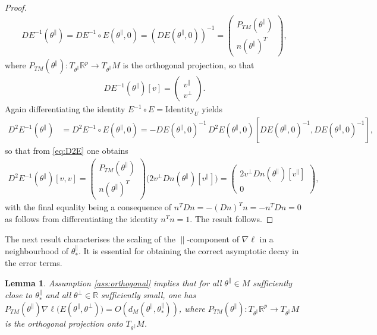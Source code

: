 \documentclass{article}
\newcommand{\RB}{\mathbb{R}}
\newcommand{\tpa}{\theta^{\parallel}}
\newcommand{\tpe}{\theta^{\perp}}
\theoremstyle{plain}
\newtheorem{lemma}[theorem]{Lemma}
\theoremstyle{definition}
\theoremstyle{remark}
\begin{document}
\begin{proof}
    \begin{align}
        DE^{-1}(\tpa) = DE^{-1}\circ E(\tpa,0) = (DE(\tpa,0))^{-1} = \begin{pmatrix} P_{TM}(\tpa) \\ n(\tpa)^T\end{pmatrix},
    \end{align}
    where $P_{TM}(\tpa):T_{\tpa}\RB^p\rightarrow T_{\tpa}M$ is the orthogonal projection, so that
    \begin{align}
        DE^{-1}(\tpa)[v] = \begin{pmatrix} v^{\parallel} \\ v^{\perp}\end{pmatrix}.
    \end{align}
    Again differentiating the identity $E^{-1}\circ E = \text{Identity}_{U}$ yields
    \begin{align}
        D^2E^{-1}(\tpa) &= D^2E^{-1}\circ E(\tpa,0) = -DE(\tpa,0)^{-1}\,D^2E(\tpa,0)[DE(\tpa,0)^{-1},DE(\tpa,0)^{-1}],
    \end{align}
    so that from \eqref{eq:D2E} one obtains
    \begin{align}
        D^2E^{-1}(\tpa)[v,v] = \begin{pmatrix} P_{TM}(\tpa) \\ n(\tpa)^T\end{pmatrix}\big(2v^{\perp}Dn(\tpa)[v^{\parallel}]) = \begin{pmatrix} 2v^{\perp}Dn(\tpa)[v^{\parallel}] \\ 0\end{pmatrix},
    \end{align}
    with the final equality being a consequence of $n^TDn = -(Dn)^Tn = -n^TDn = 0$ as follows from differentiating the identity $n^Tn = 1$. The result follows.
\end{proof}

The next result characterises the scaling of the $\parallel$-component of $\nabla\ell$ in a neighbourhood of $\tpa_*$. It is essential for obtaining the correct asymptotic decay in the error terms.

\begin{lemma}\label{lem:nablaellscaling}
    Assumption \ref{ass:orthogonal} implies that for all $\tpa\in M$ sufficiently close to $\tpa_*$ and all $\tpe\in\RB$ sufficiently small, one has $P_{TM}(\tpa)\nabla\ell\big(E(\tpa,\tpe)\big) = O(d_M(\tpa,\tpa_*))$, where $P_{TM}(\tpa):T_{\tpa}\RB^p\rightarrow T_{\tpa}M$ is the orthogonal projection onto $T_{\tpa}M$.
\end{lemma}
\end{document}
